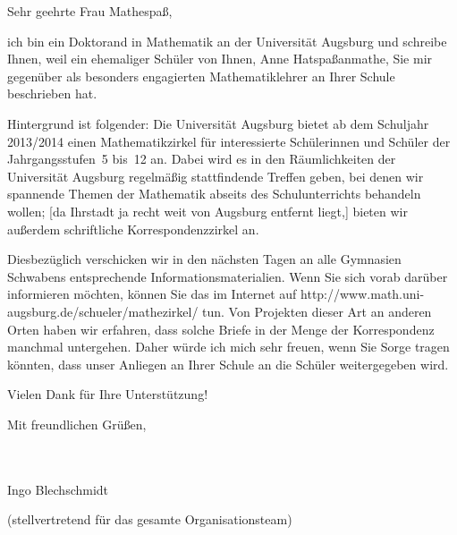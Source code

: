 \documentclass{zirkelbrief}
\begin{document}
\renewcommand{\anschrift}{%
      Holbein-Gymnasium Augsburg \\
      Fachbereich Mathematik \\
      Hallstraße 10 \\
      86150 Augsburg}
\renewcommand{\datum}{\today}
\renewcommand{\betreff}{Matheschülerzirkel der Universität Augsburg}
\renewcommand{\absender}{%
      \textbf{Ingo Blechschmidt} \\
      \ \\
      Lehrstuhl für Algebra und Zahlentheorie \\
      Universitätsstr. 14 \\
      86159 Augsburg \\
      \ \\
      Telefon \> +49 (0) 821 598 -- 5601 \\
      Telefax \> +49 (0) 821 598 -- 2090 \\
      \textsf{ingo.blechschmidt@math.uni-augsburg.de} \\}

\makeletterhead

Sehr geehrte Frau Mathespaß,

ich bin ein Doktorand in Mathematik an der Universität Augsburg und schreibe
Ihnen, weil ein ehemaliger Schüler von Ihnen, Anne Hatspaßanmathe, Sie mir
gegenüber als besonders engagierten Mathematiklehrer an Ihrer Schule
beschrieben hat.

Hintergrund ist folgender: Die Universität Augsburg bietet ab dem Schuljahr 2013/2014 einen
Mathematikzirkel für interessierte Schülerinnen und Schüler der
Jahrgangsstufen~5 bis~12 an. Dabei wird es in den Räumlichkeiten der
Universität Augsburg regelmäßig stattfindende Treffen geben, bei denen wir
spannende Themen der Mathematik abseits des Schulunterrichts behandeln wollen;
[da Ihrstadt ja recht weit von Augsburg entfernt liegt,] bieten wir außerdem
schriftliche Korrespondenzzirkel an.

Diesbezüglich verschicken wir in den nächsten Tagen an alle Gymnasien Schwabens
entsprechende Informationsmaterialien. Wenn Sie sich vorab darüber informieren
möchten, können Sie das im Internet auf
\textsf{http:/\!/www.math.uni-augsburg.de/schueler/mathezirkel/} tun. Von Projekten dieser Art an
anderen Orten haben wir erfahren, dass solche Briefe in der Menge der
Korrespondenz manchmal untergehen. Daher würde ich mich sehr freuen, wenn Sie
Sorge tragen könnten, dass unser Anliegen an Ihrer Schule an die Schüler
weitergegeben wird.

Vielen Dank für Ihre Unterstützung!

Mit freundlichen Grüßen,

\ \\
\ \\

\qquad Ingo Blechschmidt

\qquad (stellvertretend für das gesamte Organisationsteam)
\end{document}
